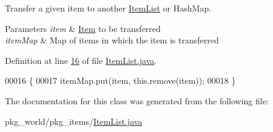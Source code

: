 Transfer a given item to another \hyperlink{classpkg__world_1_1pkg__items_1_1ItemList}{Item\-List} or Hash\-Map. 


\begin{DoxyParams}{Parameters}
{\em item} & \hyperlink{classpkg__world_1_1pkg__items_1_1Item}{Item} to be transferred \\
\hline
{\em item\-Map} & Map of items in which the item is transferred \\
\hline
\end{DoxyParams}


Definition at line \hyperlink{ItemList_8java_source_l00016}{16} of file \hyperlink{ItemList_8java_source}{Item\-List.\-java}.


\begin{DoxyCode}
00016                                                                      \{
00017         itemMap.put(item, this.remove(item));
00018     \}
\end{DoxyCode}


The documentation for this class was generated from the following file\-:\begin{DoxyCompactItemize}
\item 
pkg\-\_\-world/pkg\-\_\-items/\hyperlink{ItemList_8java}{Item\-List.\-java}\end{DoxyCompactItemize}
